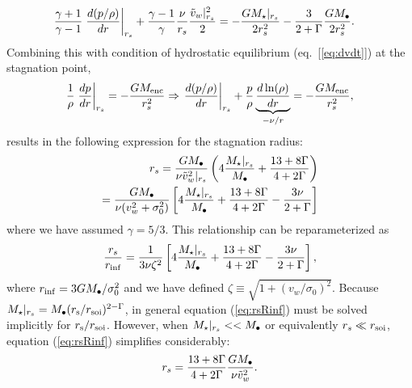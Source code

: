 \begin{align}
&\frac{\gamma+1}{\gamma-1}
\left.\frac{d (p/\rho)}{d r}\right|_{r_s}+ \frac{\gamma-1}{\gamma} \frac{\nu}{r_s} \frac{\tilde{v}_{w}|_{r_s}^{2}}{2} = -\frac{G
  M_{\star}|_{r_s}}{2 r_s^2} -\frac{3}{2+\Gamma} \frac{G M_{\bullet}}{2 r_s^2}.  \label{eq:rs1}
\end{align}
Combining this with condition of hydrostatic equilibrium (eq.~[\ref{eq:dvdt}]) at the stagnation point,
\begin{align}
\frac{1}{\rho}\left.\frac{d p}{d r}\right|_{r_s}=- \frac{GM_{\rm enc}}{r_s^2} \Rightarrow
\left.\frac{d (p/\rho)}{d r}\right|_{r_s} +\frac{p}{\rho}
\underbrace{\frac{d\ln(\rho)}{dr}}_{-\nu/r} = -\frac{G M_{\rm enc}}{r_s^2}, \label{eq:HSE}
\end{align}
results in the following expression for the stagnation radius:
\begin{align}
r_s=\frac{G M_{\bullet}}{\nu \tilde{v}_{w}^{2}|_{r_s}}\left(4
  \frac{M_{\star}|_{r_s}}{M_{\bullet}} +\frac{13+ 8\Gamma}{4+2\Gamma}\right) \nonumber \\
=\frac{G M_{\bullet}}{\nu (v_w^{2}+\sigma_0^2)}\left[4
    \frac{M_{\star}|_{r_s}}{M_{\bullet}} +\frac{13+ 8\Gamma}{4+2\Gamma}-\frac{3\nu }{2+\Gamma}\right]
\label{eq:rs2main}
\end{align}
where we have assumed $\gamma=5/3$.  This relationship can be reparameterized as
\begin{align}
  \frac{r_s}{r_{\rm inf}}=\frac{1}{3\nu \zeta^2} \left[4\frac{M_{\star}|_{r_s}}{M_{\bullet}} +\frac{13+8\Gamma}{4+2\Gamma}- \frac{3\nu }{2+\Gamma}\right],
  \label{eq:rsRinf}
\end{align}
where $r_{\rm inf}=3 G M_{\bullet}/\sigma_0^2$ and we have defined $\zeta \equiv \sqrt{1 + (v_w/\sigma_0)^2}$.  Because $M_{\star}|_{r_s} = M_{\bullet}(r_{\rm s}/r_{\rm soi})^{2-\Gamma}$, in general equation (\ref{eq:rsRinf}) must be solved implicitly for $r_{\rm s}/r_{\rm soi}$.  However, when $M_{\star}|_{r_s} << M_{\bullet}$ or equivalently $r_s \ll r_{\rm soi}$, equation (\ref{eq:rsRinf}) simplifies considerably:
\begin{align}
r_s=\frac{13+8\Gamma}{4+2\Gamma} \frac{G M_{\bullet}}{\nu \tilde{v}_{w}^2}.
\end{align}
